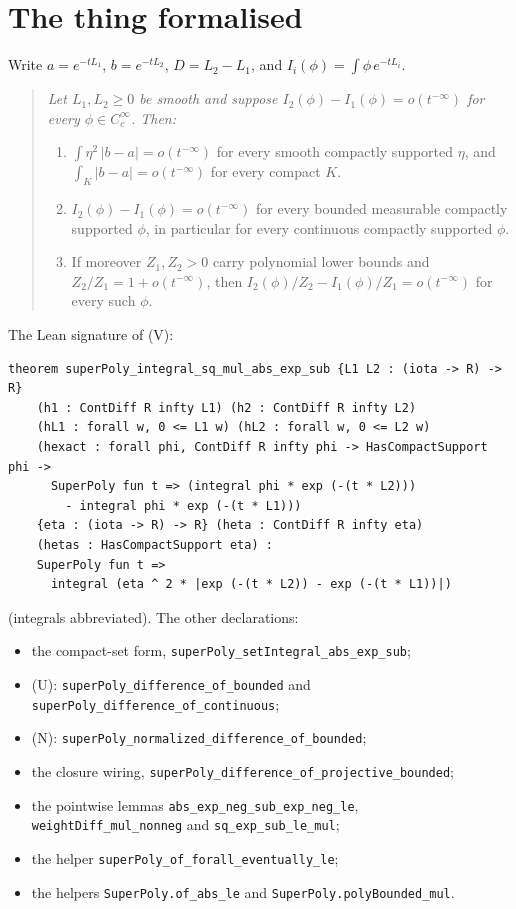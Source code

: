 \documentclass[11pt]{article}
\newcommand{\code}[1]{\texttt{#1}}
\begin{document}
\section{The thing formalised}

Write $a = e^{-tL_1}$, $b = e^{-tL_2}$, $D = L_2 - L_1$, and
$I_i(\phi) = \int\phi\,e^{-tL_i}$.

\begin{quote}\itshape
Let $L_1, L_2 \ge 0$ be smooth and suppose $I_2(\phi) - I_1(\phi) =
o(t^{-\infty})$ for every $\phi \in C_c^\infty$. Then:
\begin{enumerate}
\item[(V)] $\int\eta^2\,|b - a| = o(t^{-\infty})$ for every smooth
compactly supported $\eta$, and $\int_K|b - a| = o(t^{-\infty})$ for
every compact $K$.
\item[(U)] $I_2(\phi) - I_1(\phi) = o(t^{-\infty})$ for every bounded
measurable compactly supported $\phi$, in particular for every
continuous compactly supported $\phi$.
\item[(N)] If moreover $Z_1, Z_2 > 0$ carry polynomial lower bounds and
$Z_2/Z_1 = 1 + o(t^{-\infty})$, then $I_2(\phi)/Z_2 - I_1(\phi)/Z_1 =
o(t^{-\infty})$ for every such $\phi$.
\end{enumerate}
\end{quote}

\noindent The Lean signature of (V):
\begin{verbatim}
theorem superPoly_integral_sq_mul_abs_exp_sub {L1 L2 : (iota -> R) -> R}
    (h1 : ContDiff R infty L1) (h2 : ContDiff R infty L2)
    (hL1 : forall w, 0 <= L1 w) (hL2 : forall w, 0 <= L2 w)
    (hexact : forall phi, ContDiff R infty phi -> HasCompactSupport phi ->
      SuperPoly fun t => (integral phi * exp (-(t * L2)))
        - integral phi * exp (-(t * L1)))
    {eta : (iota -> R) -> R} (heta : ContDiff R infty eta)
    (hetas : HasCompactSupport eta) :
    SuperPoly fun t =>
      integral (eta ^ 2 * |exp (-(t * L2)) - exp (-(t * L1))|)
\end{verbatim}
(integrals abbreviated). The other declarations:
\begin{itemize}
\item the compact-set form, \code{superPoly\_setIntegral\_abs\_exp\_sub};
\item (U): \code{superPoly\_difference\_of\_bounded} and
\code{superPoly\_difference\_of\_continuous};
\item (N): \code{superPoly\_normalized\_difference\_of\_bounded};
\item the closure wiring,
\code{superPoly\_difference\_of\_projective\_bounded};
\item the pointwise lemmas \code{abs\_exp\_neg\_sub\_exp\_neg\_le},
\code{weightDiff\_mul\_nonneg} and \code{sq\_exp\_sub\_le\_mul};
\item the helper \code{superPoly\_of\_forall\_eventually\_le};
\item the helpers \code{SuperPoly.of\_abs\_le} and
\code{SuperPoly.polyBounded\_mul}.
\end{itemize}
\end{document}
